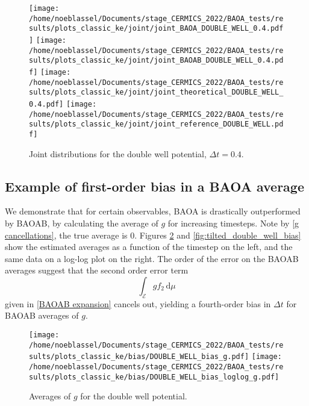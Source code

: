 \begin{figure}[htbp]
  \begin{center}
    \texttt{[image: /home/noeblassel/Documents/stage\_CERMICS\_2022/BAOA\_tests/results/plots\_classic\_ke/joint/joint\_BAOA\_DOUBLE\_WELL\_0.4.pdf]}
    \texttt{[image: /home/noeblassel/Documents/stage\_CERMICS\_2022/BAOA\_tests/results/plots\_classic\_ke/joint/joint\_BAOAB\_DOUBLE\_WELL\_0.4.pdf]}
    \texttt{[image: /home/noeblassel/Documents/stage\_CERMICS\_2022/BAOA\_tests/results/plots\_classic\_ke/joint/joint\_theoretical\_DOUBLE\_WELL\_0.4.pdf]}
    \texttt{[image: /home/noeblassel/Documents/stage\_CERMICS\_2022/BAOA\_tests/results/plots\_classic\_ke/joint/joint\_reference\_DOUBLE\_WELL.pdf]}
    \caption{ \label{fig:joint_double_well}
      Joint distributions for the double well potential, $\Delta t=0.4$.
    }
  \end{center}
\end{figure}

\subsection{Example of first-order bias in a BAOA average}\label{why muP bad}
We demonstrate that for certain observables, BAOA is drastically outperformed by BAOAB, by calculating the average of $g$ for increasing timesteps. Note by \eqref{g cancellations}, the true average is 0. Figures \ref{fig:double_well_bias} and \ref{fig:tilted_double_well_bias} show the estimated averages as a function of the timestep on the left, and the same data on a log-log plot on the right. The order of the error on the BAOAB averages suggest that the second order error term
$$\int_{\mathcal E}gf_2\,\mathrm{d}\mu$$
given in \eqref{BAOAB expansion} cancels out, yielding a fourth-order bias in $\Delta t$ for BAOAB averages of $g$.

\begin{figure}[htbp]
  \begin{center}
    \texttt{[image: /home/noeblassel/Documents/stage\_CERMICS\_2022/BAOA\_tests/results/plots\_classic\_ke/bias/DOUBLE\_WELL\_bias\_g.pdf]}
    \texttt{[image: /home/noeblassel/Documents/stage\_CERMICS\_2022/BAOA\_tests/results/plots\_classic\_ke/bias/DOUBLE\_WELL\_bias\_loglog\_g.pdf]}
    \caption{ \label{fig:double_well_bias}
      Averages of $g$ for the double well potential.
    }
  \end{center}
\end{figure}

